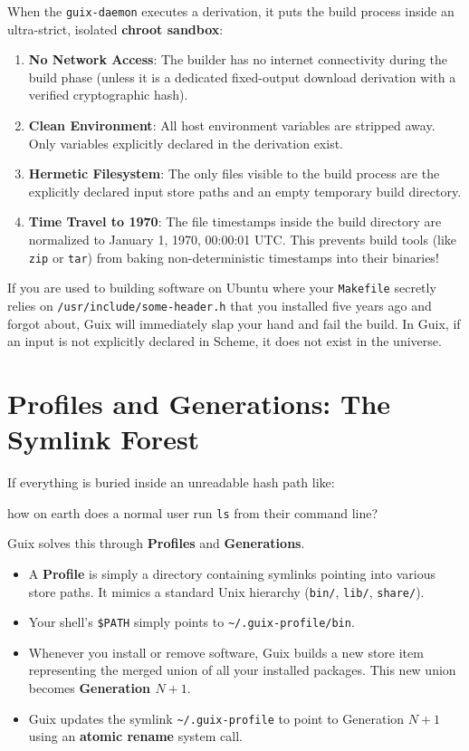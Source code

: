 When the \texttt{guix-daemon} executes a derivation, it puts the build process inside an ultra-strict, isolated \textbf{chroot sandbox}:
\begin{enumerate}
  \item \textbf{No Network Access}: The builder has no internet connectivity during the build phase (unless it is a dedicated fixed-output download derivation with a verified cryptographic hash).
  \item \textbf{Clean Environment}: All host environment variables are stripped away. Only variables explicitly declared in the derivation exist.
  \item \textbf{Hermetic Filesystem}: The only files visible to the build process are the explicitly declared input store paths and an empty temporary build directory.
  \item \textbf{Time Travel to 1970}: The file timestamps inside the build directory are normalized to January 1, 1970, 00:00:01 UTC. This prevents build tools (like \texttt{zip} or \texttt{tar}) from baking non-deterministic timestamps into their binaries!
\end{enumerate}

\begin{footgunbox}
If you are used to building software on Ubuntu where your \texttt{Makefile} secretly relies on \texttt{/usr/include/some-header.h} that you installed five years ago and forgot about, Guix will immediately slap your hand and fail the build. In Guix, if an input is not explicitly declared in Scheme, it does not exist in the universe.
\end{footgunbox}

\section{Profiles and Generations: The Symlink Forest}

If everything is buried inside an unreadable hash path like:
\begin{center}
\end{center}
how on earth does a normal user run \texttt{ls} from their command line?

Guix solves this through \textbf{Profiles} and \textbf{Generations}.

\begin{itemize}
  \item A \textbf{Profile} is simply a directory containing symlinks pointing into various store paths. It mimics a standard Unix hierarchy (\texttt{bin/}, \texttt{lib/}, \texttt{share/}).
  \item Your shell's \texttt{\$PATH} simply points to \texttt{\textasciitilde/.guix-profile/bin}.
  \item Whenever you install or remove software, Guix builds a new store item representing the merged union of all your installed packages. This new union becomes \textbf{Generation $N+1$}.
  \item Guix updates the symlink \texttt{\textasciitilde/.guix-profile} to point to Generation $N+1$ using an \textbf{atomic rename} system call.
\end{itemize}

